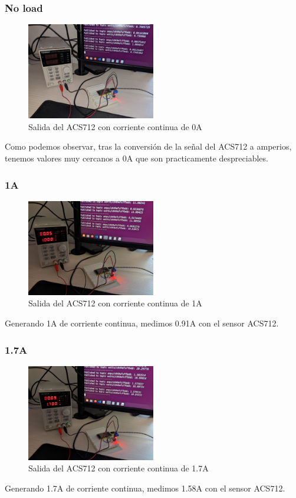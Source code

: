 \begin{titlepage}
\subsubsection{No load}
\begin{figure}[h!]
	\centering
	\includegraphics[width=0.5\textwidth]{imagenes/DC_noload.jpg}
	\caption{Salida del ACS712 con corriente continua de 0A}
\end{figure}
Como podemos observar, tras la conversión de la señal del ACS712 a amperios, tenemos valores muy cercanos a 0A que son practicamente despreciables. \\
\subsubsection{1A}
\begin{figure}[h!]
	\centering
	\includegraphics[width=0.5\textwidth]{imagenes/DC_1Amp.jpg}
	\caption{Salida del ACS712 con corriente continua de 1A}
\end{figure}
Generando 1A de corriente continua, medimos 0.91A con el sensor ACS712. \\
\subsubsection{1.7A}
\begin{figure}[h!]
	\centering
	\includegraphics[width=0.5\textwidth]{imagenes/DC_1_7Amp.jpg}
	\caption{Salida del ACS712 con corriente continua de 1.7A}
\end{figure}
Generando 1.7A de corriente continua, medimos 1.58A con el sensor ACS712. \\

\end{titlepage}

